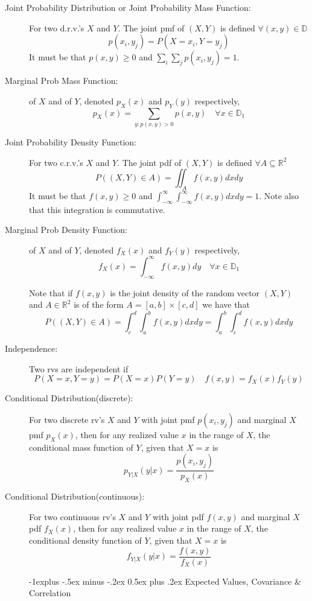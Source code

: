 \documentclass[10pt,landscape]{article}
\makeatletter
\renewcommand{\subsection}{\@startsection{subsection}{2}{0mm}%
                                {-1explus -.5ex minus -.2ex}%
                                {0.5ex plus .2ex}%
                                {\normalfont\normalsize\bfseries}}
\makeatother
\begin{document}
\begin{multicols}{3}
\begin{description}
  \item[Joint Probability Distribution or Joint Probability Mass Function:] For two d.r.v.'s $X$ and $Y$.  The joint pmf of $(X,Y)$ is defined $\forall (x,y) \in \mathbb{D}$
$$  p(x_{i}, y_{j}) = P(X = x_{i}, Y = y_{j}) $$
It must be that $p(x,y) \geq 0$ and $\sum_i \sum_j p(x_{i}, y_{j}) = 1$.
  \item[Marginal Prob Mass Function:] of $X$ and of $Y$, denoted $p_{X}(x)$ and $p_{Y}(y)$ respectively,
$$  p_{X}(x) = \sum_{y: p(x,y) >0} p(x,y) \quad \forall x \in \mathbb{D}_1$$

	\item[Joint Probability Density Function:] For two c.r.v.'s $X$ and $Y$.  The joint pdf of $(X,Y)$ is defined $\forall A \subseteq \mathbb{R}^2$
$$  P((X,Y)\in A) = \iint_{A} f(x,y)dx dy $$
It must be that $f(x,y) \geq 0$ and $\int_{-\infty}^{\infty} \int_{-\infty}^{\infty} f(x, y) dx dy= 1$. Note also that this integration is commutative.

  \item[Marginal Prob Density Function:] of $X$ and of $Y$, denoted $f_{X}(x)$ and $f_{Y}(y)$ respectively,
$$  f_{X}(x) = \int_{-\infty}^{\infty} f(x,y) dy \quad \forall x \in \mathbb{D}_1$$

Note that if $f(x,y)$ is the joint density of the random vector $(X,Y)$ and $A \in \mathbb{R}^2$ is of the form $A= [a,b]\times[c,d]$ we have that
$$  P((X,Y)\in A) = \int_{c}^{d} \int_{a}^{b} f(x, y) dx dy = \int_{a}^{b} \int_{c}^{d} f(x, y) dx dy $$

  \item[Independence:] Two rvs are independent if 
$$ P(X=x, Y=y) = P(X=x) P(Y=y) \quad  f(x,y) = f_{X}(x) f_{Y}(y)$$

  \item[Conditional Distribution(discrete):] For two discrete rv's $X$ and $Y$ with joint pmf $p(x_{i}, y_{j})$ and marginal $X$ pmf $  p_{X}(x)$, then for any realized value $x$ in the range of $X$, the conditional mass function of $Y$, given that $X=x$ is 
$$  p_{Y|X}(y|x) = \frac{p(x_{i}, y_{j})}{p_{X}(x)} $$

  \item[Conditional Distribution(continuous):] For two continuous rv's $X$ and $Y$ with joint pdf $f(x,y)$ and marginal $X$ pdf $  f_{X}(x)$, then for any realized value $x$ in the range of $X$, the conditional density function of $Y$, given that $X=x$ is 
$$  f_{Y|X}(y|x) = \frac{f(x, y)}{f_{X}(x)} $$

\subsection{Expected Values, Covariance \& Correlation}


\end{description}
\end{multicols}
\end{document}
